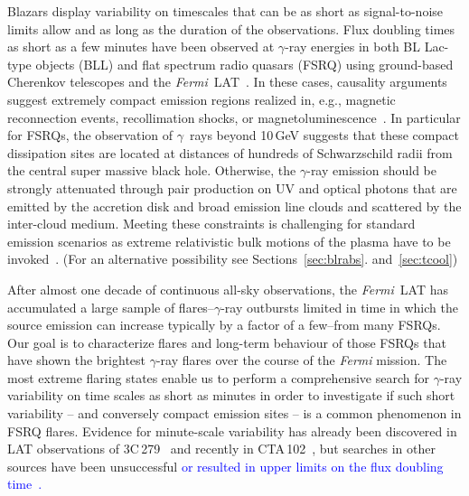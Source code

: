 \documentclass[twocolumn,linenumbers]{aastex62}
\newcommand{\Grays}{$\gamma$~rays\xspace}
\newcommand{\gray}{$\gamma$-ray\xspace}
\newcommand{\Fermi}{\emph{Fermi}\xspace}
\newcommand{\FermiLAT}{\emph{Fermi}~LAT\xspace}
\newcommand{\response}[1]{\textcolor{blue}{#1}}
\begin{document}
Blazars display variability on timescales that can be as short as signal-to-noise limits allow and as long as the duration of the observations.
Flux doubling times as short as a few minutes have been observed at \gray energies in both BL Lac-type objects (BLL) and flat spectrum radio quasars (FSRQ) using  ground-based Cherenkov telescopes and the \FermiLAT~\cite[e.g.,][]{2007ApJ...669..862A,pks2155hess2007,pks1222magic2011,2013ApJ...762...92A,2014Sci...346.1080A,TheFermi-LAT:2016dss,2018ApJ...854L..26S}.
In these cases, causality arguments suggest extremely compact emission regions realized in, e.g., magnetic reconnection events, recollimation shocks, or magnetoluminescence~\cite[e.g.][]{Petropoulou:2016xat,Bodo:2017qqn,blandford:2017mag}.
In particular for FSRQs, the observation of \Grays beyond 10\,GeV suggests that these compact dissipation sites are located at distances of hundreds of Schwarzschild  radii from the central super massive black hole. 
Otherwise, the \gray emission should be strongly attenuated through pair production on UV and optical photons that are emitted by the accretion disk and broad emission line clouds and scattered by the inter-cloud medium.
Meeting these constraints is challenging for standard emission scenarios as extreme relativistic bulk motions of the plasma have to be invoked~\cite[e.g.,][]{2010MNRAS.405L..94T,2011A&A...534A..86T,TheFermi-LAT:2016dss}.  (For an alternative possibility see Sections~\ref{sec:blrabs}. and~\ref{sec:tcool})

After almost one decade of continuous all-sky observations, the \FermiLAT has accumulated a large sample of flares--\gray outbursts limited in time in which the source emission can increase typically by a factor of a few--from many FSRQs.
Our goal is to characterize flares and long-term behaviour of those FSRQs that have shown the brightest \gray flares over the course of the \Fermi mission. 
The most extreme flaring states enable us to perform a comprehensive search for \gray variability on time scales as short as minutes in order to investigate if such short variability -- and conversely compact emission sites -- is a common phenomenon in FSRQ flares. 
Evidence for minute-scale variability has already been discovered in LAT observations of 3C\,279~\citep{TheFermi-LAT:2016dss} and recently in CTA\,102~\citep{2018ApJ...854L..26S}, but searches in other sources have been unsuccessful \citep{2017Galax...5..100N} 
\response{
or resulted in upper limits on the flux doubling time~\citep{2011A&A...530A..77F}.
}
\end{document}
